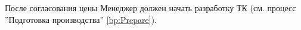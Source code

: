 После согласования цены Менеджер должен начать разработку ТК (см. процесс ''Подготовка производства'' \ref{bp:Prepare}).









